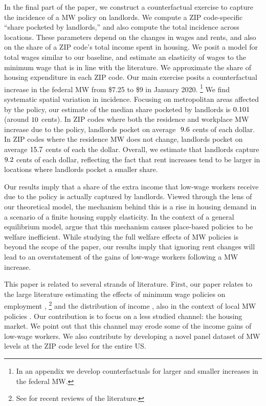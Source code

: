 
In the final part of the paper, we construct a counterfactual exercise to 
capture the incidence of a MW policy on landlords.
We compute a ZIP code-specific ``share pocketed by landlords,'' and also
compute the total incidence across locations.
These parameters depend on the changes in wages and rents, and also on the 
share of a ZIP code's total income spent in housing.
We posit a model for total wages similar to our baseline, and estimate an 
elasticity of wages to the minimum wage that is in line with the literature.
We approximate the share of housing expenditure in each ZIP code.
Our main exercise posits a counterfactual increase in the federal MW 
from \$7.25 to \$9 in January 2020.%
\footnote{In an appendix we develop counterfactuals for larger and smaller 
increases in the federal MW.}
We find systematic spatial variation in incidence.
Focusing on metropolitan areas affected by the policy, our estimate of the 
median share pocketed by landlords is $\textnormal{0.101}$ 
(around $\textnormal{10}$ cents).
In ZIP codes where both the residence and workplace MW increase due to 
the policy, landlords pocket on average $\textnormal{ 9.6}$ cents of each 
dollar.
In ZIP codes where the residence MW does not change, landlords pocket on average
$\textnormal{15.7}$ cents of each the dollar.
Overall, we estimate that landlords capture $\textnormal{9.2}$ cents
of each dollar, reflecting the fact that rent increases tend to be larger in 
locations where landlords pocket a smaller share.

Our results imply that a share of the extra income that low-wage workers
receive due to the policy is actually captured by landlords.
Viewed through the lens of our theoretical model,
the mechanism behind this is a rise in housing demand in a scenario of a 
finite housing supply elasticity.
In the context of a general equilibrium model, \textcite{KlineMoretti2014} argue
that this mechanism causes place-based policies to be welfare inefficient.
While studying the full welfare effects of MW policies is beyond the scope of 
the paper, our results imply that ignoring rent changes will lead to an 
overstatement of the gains of low-wage workers following a MW increase.


This paper is related to several strands of literature.
First, our paper relates to the large literature estimating the effects of 
minimum wage policies on employment
\parencite[e.g.,][]{CardKrueger1994, NeumarkWascher2007, MeerWest2016, CegnizEtAl2019},%
\footnote{See \textcite{Dube2019, NeumarkShirley2021} for recent reviews of the 
literature.} 
and the distribution of income 
\parencite[e.g.,][]{Lee1999, AutorEtAl2016, Dube2019Income}, also in 
the context of local MW policies 
\parencite[e.g.,][]{DubeNaiduReich2007, SchmittRosnick2011, DubeLindner2021}.
Our contribution is to focus on a less studied channel: the housing market.
We point out that this channel may erode some of the income gains of low-wage 
workers.
We also contribute by developing a novel panel dataset of MW levels at the 
ZIP code level for the entire US.

